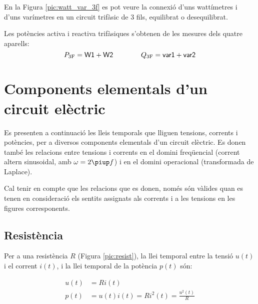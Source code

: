 En la Figura \vref{pic:watt_var_3f} es pot veure la connexió d'uns
wattímetres i d'uns varímetres en un circuit trifàsic de 3 fils,
equilibrat o desequilibrat.

\begin{center}
\centering
    
    \label{pic:watt_var_3f}
\end{center}

Les potències activa i reactiva trifàsiques s'obtenen de les mesures
dels quatre aparells:
\begin{equation}
    P_\mathrm{3F} = \textsf{W1} +  \textsf{W2}
    \qquad\qquad Q_\mathrm{3F} = \textsf{var1} +  \textsf{var2}
\end{equation}


\section{Components elementals d'un circuit elèctric}\label{sec:comp_elem}

Es presenten a continuació les lleis temporals que lliguen tensions,
corrents i potències, per a diversos components elementals d'un
circuit elèctric. Es donen també les relacions entre tensions i
corrents en el domini freqüencial (corrent altern sinusoidal, amb
$\omega=2\piup f$) i en el domini operacional (transformada de
Laplace).

Cal tenir en compte que les relacions que es donen, només són
vàlides  quan es tenen en consideració els sentits assignats als
corrents i a les tensions en les figures corresponents.

\subsection{Resistència} 

Per a una resistència $R$ (Figura
\vref{pic:resist}), la llei temporal entre la tensió $u(t)$ i el
corrent $i(t)$, i la llei temporal de la potència $p(t)$ són:


\hfill
\begin{minipage}[b]{5cm}
    
    \label{pic:resist}
\end{minipage}
\hfill
\begin{minipage}[b][3.25cm][t]{8cm}
   \begin{align}
      u(t) &= R i(t) \\  p(t) &= u(t) i(t) = R i^2(t) = \frac{u^2(t)}{R}
   \end{align}
\end{minipage}

